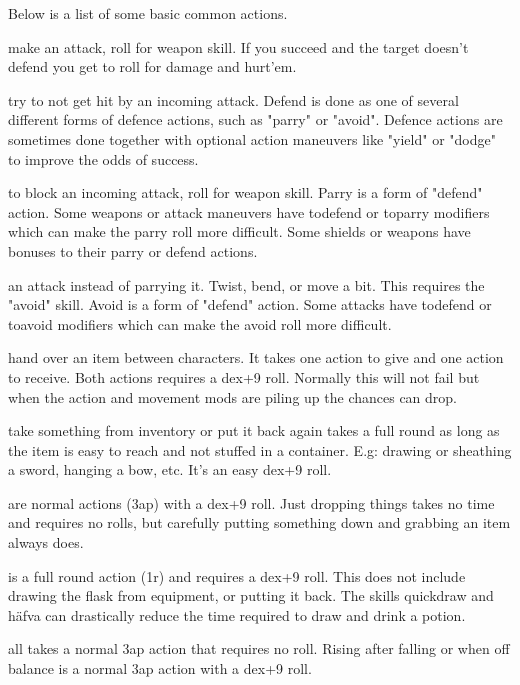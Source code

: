 Below is a list of some basic common actions.

\openactionslist


 make an attack, roll for weapon skill. If you succeed and the target doesn't defend you get to roll for damage and hurt'em.


 try to not get hit by an incoming attack. Defend is done as one of several different forms of defence actions, such as "parry" or "avoid". Defence actions are sometimes done together with optional action maneuvers like "yield" or "dodge" to improve the odds of success.


 to block an incoming attack, roll for weapon skill.
Parry is a form of "defend" action. Some weapons or attack maneuvers have todefend or toparry modifiers which can make the parry roll more difficult. Some shields or weapons have bonuses to their parry or defend actions.


 an attack instead of parrying it. Twist, bend, or move a bit. This requires the "avoid" skill. Avoid is a form of "defend" action. Some attacks have todefend or toavoid modifiers which can make the avoid roll more difficult.


 hand over an item between characters. It takes one action to give and one action to receive. Both actions requires a dex+9 roll. Normally this will not fail but when the action and movement mods are piling up the chances can drop.


 take something from inventory or put it back again takes a full round as long as the item is easy to reach and not stuffed in a container. E.g: drawing or sheathing a sword, hanging a bow, etc. It's an easy dex+9 roll. 


 are normal actions (3ap) with a dex+9 roll. Just dropping things takes no time and requires no rolls, but carefully putting something down and grabbing an item always does.


 is a full round action (1r) and requires a dex+9 roll. This does not include drawing the flask from equipment, or putting it back. The skills quickdraw and häfva can drastically reduce the time required to draw and drink a potion.


 all takes a normal 3ap action that requires no roll. Rising after falling or when off balance is a normal 3ap action with a dex+9 roll.


